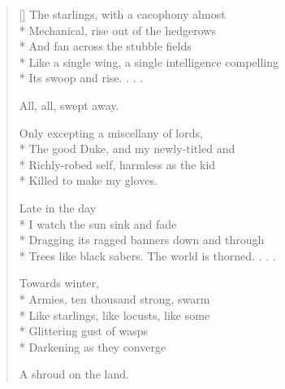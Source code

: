 \label{ch:lear_bs}
\settowidth{\versewidth}{Trees like black sabers. \qquad The world is thorned. . . .}
\begin{verse}[\versewidth]
 The starlings, with a cacophony almost\\*
Mechanical, rise out of the hedgerows\\*
And fan across the stubble fields\\*
Like a single wing, a single intelligence compelling\\*
Its swoop and rise. . . .

\hspace*{3\vgap} All, all, swept away.

Only excepting a miscellany of lords,\\*
The good Duke, and my newly-titled and\\*
Richly-robed self, harmless as the kid\\*
Killed to make my gloves.

\hspace*{3\vgap} Late in the day\\*
I watch the sun sink and fade\\*
Dragging its ragged banners down and through\\*
Trees like black sabers. \qquad The world is thorned. . . .

Towards winter,\\*
Armies, ten thousand strong, swarm\\*
Like starlings, like locusts, like some\\*
Glittering gust of wasps\\*
Darkening as they converge

A shroud on the land.\qquad
\end{verse}
